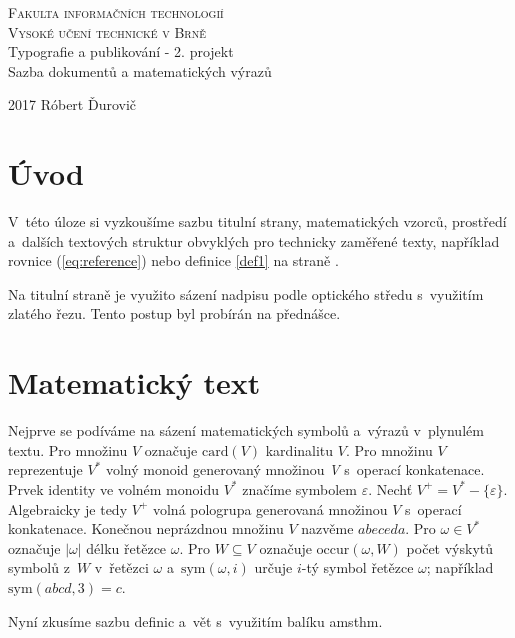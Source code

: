 \documentclass[a4paper,11pt,twocolumn]{article}
\theoremstyle{definition}
\begin{document}
\thispagestyle{empty}

\onecolumn
\begin{center}
    \Huge
    \textsc{Fakulta informačních technologií \\
            Vysoké učení technické v Brně}\\
        \huge Typografie a publikování - 2. projekt\\
        Sazba dokumentů a matematických výrazů\\
\end{center}
{\LARGE 2017 \hfill
Róbert Ďurovič}

\newpage

\twocolumn

\section*{Úvod}

V~této úloze si vyzkoušíme sazbu titulní strany, matematických vzorců, prostředí a~dalších textových struktur obvyklých pro technicky zaměřené texty, například rovnice (\ref{eq:reference}) nebo definice \ref{def1} na straně \pageref{def1}.

Na titulní straně je využito sázení nadpisu podle optického středu s~využitím zlatého řezu. Tento postup byl probírán na přednášce.

\section{Matematický text}

Nejprve se podíváme na sázení matematických symbolů a~výrazů v~plynulém textu. Pro množinu $V$ označuje $\mbox{card}(V)$ kardinalitu $V$.
Pro množinu $V$ reprezentuje $V^*$ volný monoid generovaný množinou \textit{V} s~operací konkatenace. Prvek identity ve volném monoidu $V^*$ značíme symbolem $\varepsilon$. Nechť $V^+ = V^* - \{\varepsilon\}$. Algebraicky je tedy $V^+$ volná pologrupa generovaná množinou $V$ s~operací konkatenace. Konečnou neprázdnou množinu $V$ nazvěme $abeceda$. Pro $\omega \in V^*$ označuje $|\omega|$ délku řetězce $\omega$. Pro $W \subseteq V$ označuje $\mbox{occur}(\omega, W)$ počet výskytů symbolů z~$W$ v~řetězci $\omega$ a~$\mbox{sym}(\omega, i)$ určuje $i$-tý symbol řetězce $\omega$; například $\mbox{sym}(abcd, 3) = c$.

Nyní zkusíme sazbu definic a~vět s~využitím balíku {\ttfamily amsthm}.
\end{document}
